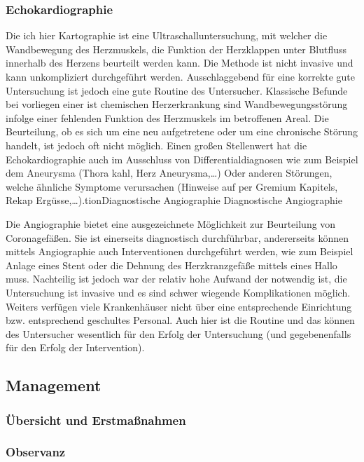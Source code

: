 \subsubsection{Echokardiographie}

Die ich hier Kartographie ist eine Ultraschalluntersuchung,
mit welcher die Wandbewegung des Herzmuskels, die Funktion
der Herzklappen unter Blutfluss innerhalb des Herzens
beurteilt werden kann. Die Methode ist nicht invasive und
kann unkompliziert durchgeführt werden. Ausschlaggebend für
eine korrekte gute Untersuchung ist jedoch eine gute Routine
des Untersucher. Klassische Befunde bei vorliegen einer ist
chemischen Herzerkrankung sind Wandbewegungsstörung infolge
einer fehlenden Funktion des Herzmuskels im betroffenen
Areal. Die Beurteilung, ob es sich um eine neu aufgetretene
oder um eine chronische Störung handelt, ist jedoch oft
nicht möglich. Einen großen Stellenwert hat die
Echokardiographie auch im Ausschluss von
Differentialdiagnosen wie zum Beispiel dem Aneurysma (Thora
kahl, Herz Aneurysma,…) Oder anderen Störungen, welche
ähnliche Symptome verursachen (Hinweise auf per Gremium
Kapitels, Rekap Ergüsse,…).tion{Diagnostische Angiographie}
Diagnostische Angiographie

Die Angiographie bietet eine ausgezeichnete Möglichkeit zur
Beurteilung von Coronagefäßen. Sie ist einerseits
diagnostisch durchführbar, andererseits können mittels
Angiographie auch Interventionen durchgeführt werden, wie
zum Beispiel Anlage eines Stent oder die Dehnung des
Herzkranzgefäße mittels eines Hallo muss. Nachteilig ist
jedoch war der relativ hohe Aufwand der notwendig ist, die
Untersuchung ist invasive und es sind schwer wiegende
Komplikationen möglich. Weiters verfügen viele Krankenhäuser
nicht über eine entsprechende Einrichtung bzw. entsprechend
geschultes Personal. Auch hier ist die Routine und das
können des Untersucher wesentlich für den Erfolg der
Untersuchung (und gegebenenfalls für den Erfolg der
Intervention).
\subsection{Management}

\subsubsection{Übersicht und Erstmaßnahmen}

\subsubsection{Observanz}


